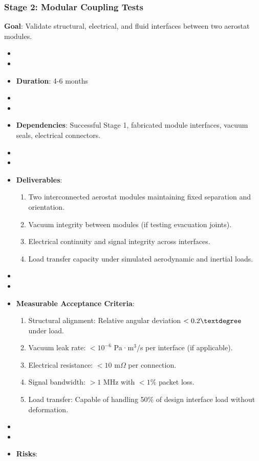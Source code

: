 \subsubsection{Stage 2: Modular Coupling Tests}
\textbf{Goal}: Validate structural, electrical, and fluid interfaces between two aerostat modules.
\begin{itemize}
    \item \item \item \textbf{Duration}: 4-6 months
    \item \item \item \textbf{Dependencies}: Successful Stage 1, fabricated module interfaces, vacuum seals, electrical connectors.
    \item \item \item \textbf{Deliverables}:
        \begin{enumerate}
            \item Two interconnected aerostat modules maintaining fixed separation and orientation.
            \item Vacuum integrity between modules (if testing evacuation joints).
            \item Electrical continuity and signal integrity across interfaces.
            \item Load transfer capacity under simulated aerodynamic and inertial loads.
        \end{enumerate}
    \item \item \item \textbf{Measurable Acceptance Criteria}:
        \begin{enumerate}
            \item Structural alignment: Relative angular deviation $< 0.2\textdegree$ under load.
            \item Vacuum leak rate: $< 10^{-6}$ Pa·m$^3$/s per interface (if applicable).
            \item Electrical resistance: $< 10$ m$\Omega$ per connection.
            \item Signal bandwidth: $> 1$ MHz with $< 1\%$ packet loss.
            \item Load transfer: Capable of handling 50\% of design interface load without deformation.
        \end{enumerate}
    \item \item \item \textbf{Risks}:

\end{itemize}
